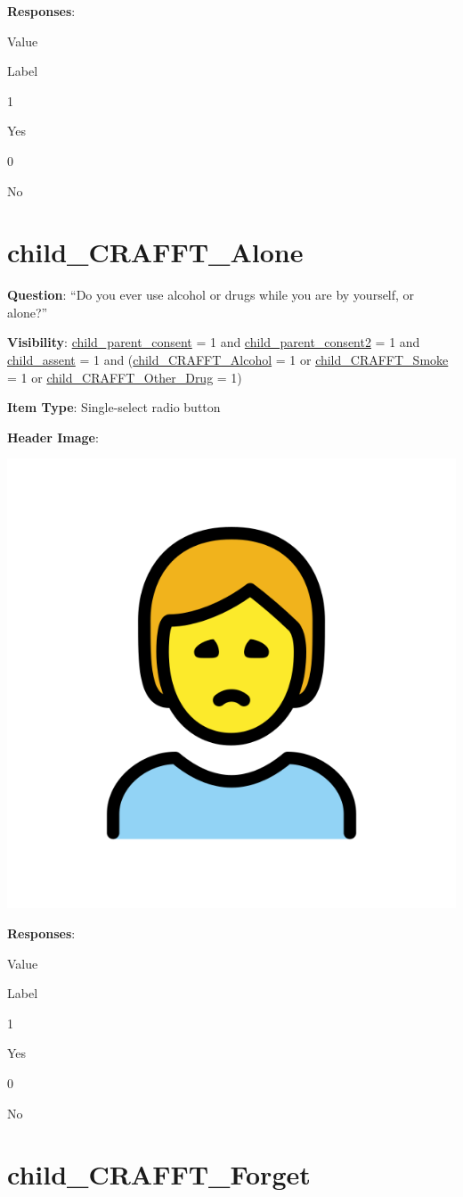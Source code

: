 \documentclass[]{book}
\begin{document}
\textbf{Responses}:

Value

Label

1

Yes

0

No

\hypertarget{child_crafft_alone}{%
\section{child\_CRAFFT\_Alone}\label{child_crafft_alone}}

\textbf{Question}: ``Do you ever use alcohol or drugs while you are by yourself, or alone?''

\textbf{Visibility}: \protect\hyperlink{child_parent_consent}{child\_parent\_consent} = 1 and \protect\hyperlink{child_parent_consent2}{child\_parent\_consent2} = 1 and \protect\hyperlink{child_assent}{child\_assent} = 1 and (\protect\hyperlink{child_crafft_alcohol}{child\_CRAFFT\_Alcohol} = 1 or \protect\hyperlink{child_crafft_smoke}{child\_CRAFFT\_Smoke} = 1 or \protect\hyperlink{child_crafft_other_drug}{child\_CRAFFT\_Other\_Drug} = 1)

\textbf{Item Type}: Single-select radio button

\textbf{Header Image}:

\begin{flushleft}\includegraphics[width=0.33\linewidth]{downloadFigs4latex_HBN_PMHS_Codebook/child_CRAFFT_Alone_headerImg} \end{flushleft}

\textbf{Responses}:

Value

Label

1

Yes

0

No

\hypertarget{child_crafft_forget}{%
\section{child\_CRAFFT\_Forget}\label{child_crafft_forget}}
\end{document}

